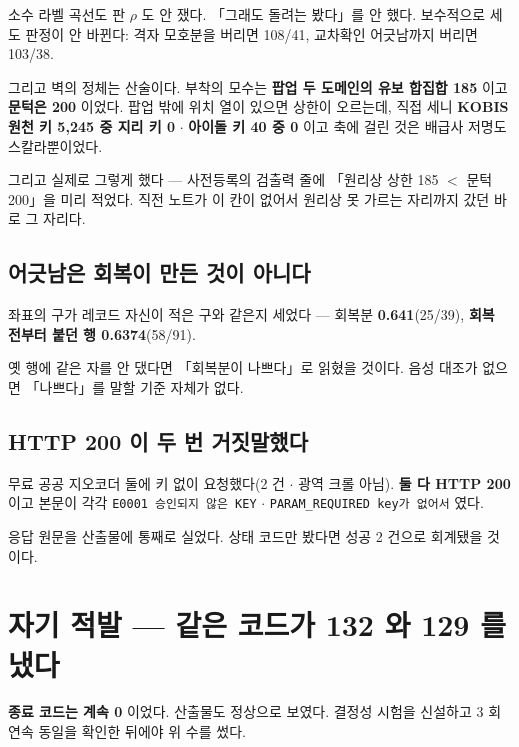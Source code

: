 \documentclass{article}
\begin{document}
{소수 라벨 곡선도 판 $\rho$ 도 안 쟀다. 「그래도 돌려는 봤다」를 안 했다.}
보수적으로 세도 판정이 안 바뀐다: 격자 모호분을 버리면 108/41, 교차확인 어긋남까지 버리면 103/38.

그리고 벽의 정체는 산술이다. 부착의 모수는 \textbf{팝업 두 도메인의 유보 합집합 185} 이고
\textbf{문턱은 200} 이었다. 팝업 밖에 위치 열이 있으면 상한이 오르는데, 직접 세니
\textbf{KOBIS 원천 키 5{,}245 중 지리 키 0} $\cdot$ \textbf{아이돌 키 40 중 0} 이고
축에 걸린 것은 배급사 저명도 스칼라뿐이었다.

{그리고 실제로 그렇게 했다 --- 사전등록의 검출력 줄에 「원리상 상한 185 $<$ 문턱 200」을 미리 적었다.
직전 노트가 이 칸이 없어서 원리상 못 가르는 자리까지 갔던 바로 그 자리다.}

\subsection{어긋남은 회복이 만든 것이 아니다}

좌표의 구가 레코드 자신이 적은 구와 같은지 세었다 ---
회복분 \textbf{0.641}(25/39), \textbf{회복 전부터 붙던 행 0.6374}(58/91).

{옛 행에 같은 자를 안 댔다면 「회복분이 나쁘다」로 읽혔을 것이다.
음성 대조가 없으면 「나쁘다」를 말할 기준 자체가 없다.}

\subsection{HTTP 200 이 두 번 거짓말했다}

무료 공공 지오코더 둘에 키 없이 요청했다(2 건 $\cdot$ 광역 크롤 아님).
\textbf{둘 다 HTTP 200} 이고 본문이 각각
\texttt{E0001 승인되지 않은 KEY} $\cdot$ \texttt{PARAM\_REQUIRED key가 없어서} 였다.

{응답 원문을 산출물에 통째로 실었다. 상태 코드만 봤다면 성공 2 건으로 회계됐을 것이다.}

\section{자기 적발 --- 같은 코드가 132 와 129 를 냈다}

{\textbf{종료 코드는 계속 0} 이었다. 산출물도 정상으로 보였다.
결정성 시험을 신설하고 3 회 연속 동일을 확인한 뒤에야 위 수를 썼다.}
\end{document}
